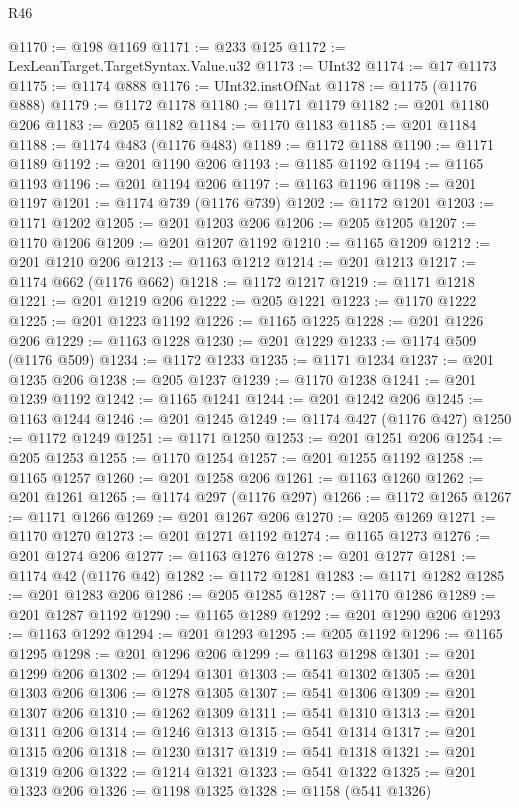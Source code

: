 \begin{lexlean}{R46}
\begin{coremodule}
@1170 := @198 @1169
@1171 := @233 @125
@1172 := LexLeanTarget.TargetSyntax.Value.u32
@1173 := UInt32
@1174 := @17 @1173
@1175 := @1174 @888
@1176 := UInt32.instOfNat
@1178 := @1175 (@1176 @888)
@1179 := @1172 @1178
@1180 := @1171 @1179
@1182 := @201 @1180 @206
@1183 := @205 @1182
@1184 := @1170 @1183
@1185 := @201 @1184
@1188 := @1174 @483 (@1176 @483)
@1189 := @1172 @1188
@1190 := @1171 @1189
@1192 := @201 @1190 @206
@1193 := @1185 @1192
@1194 := @1165 @1193
@1196 := @201 @1194 @206
@1197 := @1163 @1196
@1198 := @201 @1197
@1201 := @1174 @739 (@1176 @739)
@1202 := @1172 @1201
@1203 := @1171 @1202
@1205 := @201 @1203 @206
@1206 := @205 @1205
@1207 := @1170 @1206
@1209 := @201 @1207 @1192
@1210 := @1165 @1209
@1212 := @201 @1210 @206
@1213 := @1163 @1212
@1214 := @201 @1213
@1217 := @1174 @662 (@1176 @662)
@1218 := @1172 @1217
@1219 := @1171 @1218
@1221 := @201 @1219 @206
@1222 := @205 @1221
@1223 := @1170 @1222
@1225 := @201 @1223 @1192
@1226 := @1165 @1225
@1228 := @201 @1226 @206
@1229 := @1163 @1228
@1230 := @201 @1229
@1233 := @1174 @509 (@1176 @509)
@1234 := @1172 @1233
@1235 := @1171 @1234
@1237 := @201 @1235 @206
@1238 := @205 @1237
@1239 := @1170 @1238
@1241 := @201 @1239 @1192
@1242 := @1165 @1241
@1244 := @201 @1242 @206
@1245 := @1163 @1244
@1246 := @201 @1245
@1249 := @1174 @427 (@1176 @427)
@1250 := @1172 @1249
@1251 := @1171 @1250
@1253 := @201 @1251 @206
@1254 := @205 @1253
@1255 := @1170 @1254
@1257 := @201 @1255 @1192
@1258 := @1165 @1257
@1260 := @201 @1258 @206
@1261 := @1163 @1260
@1262 := @201 @1261
@1265 := @1174 @297 (@1176 @297)
@1266 := @1172 @1265
@1267 := @1171 @1266
@1269 := @201 @1267 @206
@1270 := @205 @1269
@1271 := @1170 @1270
@1273 := @201 @1271 @1192
@1274 := @1165 @1273
@1276 := @201 @1274 @206
@1277 := @1163 @1276
@1278 := @201 @1277
@1281 := @1174 @42 (@1176 @42)
@1282 := @1172 @1281
@1283 := @1171 @1282
@1285 := @201 @1283 @206
@1286 := @205 @1285
@1287 := @1170 @1286
@1289 := @201 @1287 @1192
@1290 := @1165 @1289
@1292 := @201 @1290 @206
@1293 := @1163 @1292
@1294 := @201 @1293
@1295 := @205 @1192
@1296 := @1165 @1295
@1298 := @201 @1296 @206
@1299 := @1163 @1298
@1301 := @201 @1299 @206
@1302 := @1294 @1301
@1303 := @541 @1302
@1305 := @201 @1303 @206
@1306 := @1278 @1305
@1307 := @541 @1306
@1309 := @201 @1307 @206
@1310 := @1262 @1309
@1311 := @541 @1310
@1313 := @201 @1311 @206
@1314 := @1246 @1313
@1315 := @541 @1314
@1317 := @201 @1315 @206
@1318 := @1230 @1317
@1319 := @541 @1318
@1321 := @201 @1319 @206
@1322 := @1214 @1321
@1323 := @541 @1322
@1325 := @201 @1323 @206
@1326 := @1198 @1325
@1328 := @1158 (@541 @1326)

\end{coremodule}
\end{lexlean}
